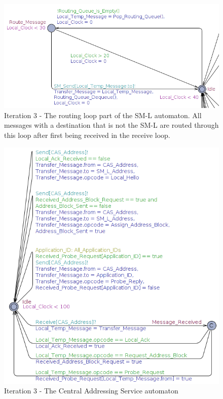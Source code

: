 \begin{figure}[ht]
    \centering
    \includegraphics[width=\textwidth]{figures/iteration3_sm_l_route_loop}
    \caption{Iteration 3 - The routing loop part of the SM-L automaton. All
    messages with a destination that is not the SM-L are routed through this
    loop after first being received in the receive loop.}
    \label{fig:iteration3_sm_l_route_loop}
\end{figure}

\begin{figure}[ht]
    \centering
    \includegraphics[width=\textwidth]{figures/iteration3_cas}
    \caption{Iteration 3 - The Central Addressing Service automaton}
    \label{fig:iteration3_cas}
\end{figure}

